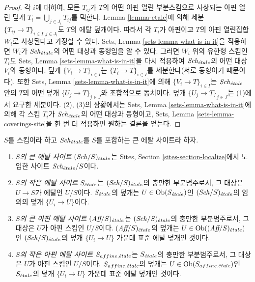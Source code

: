\begin{proof}
각 $i$에 대하여, 모든 $T_{ij}$가 $T$의 어떤 아핀 열린 부분스킴으로
사상되는 아핀 열린 덮개
$T_i = \bigcup_{j \in J_i} T_{ij}$를 택한다. Lemma
\ref{lemma-etale}에 의해 세분
$\{T_{ij} \to T\}_{i \in I, j \in J_i}$도 $T$의 에탈 덮개이다. 따라서
각 $T_i$가 아핀이고 $T$의 아핀 열린집합 $W_i$로 사상된다고 가정할 수
있다. Sets, Lemma \ref{sets-lemma-what-is-in-it}을 적용하면 $W_i$가
$\mathit{Sch}_{\acute{e}tale}$의 어떤 대상과 동형임을 알 수 있다. 그러면 $W_i$ 위의
유한형 스킴인 $T_i$도 Sets, Lemma \ref{sets-lemma-what-is-in-it}을 다시
적용하여 $\mathit{Sch}_{\acute{e}tale}$의 어떤 대상 $V_i$와 동형이다. 덮개
$\{V_i \to T\}_{i \in I}$는 $\{T_i \to T\}_{i \in I}$를 세분한다(서로
동형이기 때문이다). 또한 Sets, Lemma
\ref{sets-lemma-what-is-in-it}에 의해 $\{V_i \to T\}_{i \in I}$는
$\mathit{Sch}_{\acute{e}tale}$ 안의 $T$의 어떤 덮개 $\{U_j \to T\}_{j \in J}$와
조합적으로 동치이다. 덮개 $\{U_j \to T\}_{j \in J}$는 (1)에서 요구한
세분이다. (2), (3)의
상황에서는 Sets, Lemma \ref{sets-lemma-what-is-in-it}에 의해 각 스킴
$T_i$가 $\mathit{Sch}_{\acute{e}tale}$의 어떤 대상과 동형이고, Sets, Lemma
\ref{sets-lemma-coverings-site}을 한 번 더 적용하면 원하는 결론을 얻는다.
\end{proof}

\begin{definition}
\label{definition-big-small-etale}
$S$를 스킴이라 하고 $\mathit{Sch}_{\acute{e}tale}$를 $S$를 포함하는 큰 에탈 사이트라
하자.
\begin{enumerate}
\item {\it $S$의 큰 에탈 사이트} $(\mathit{Sch}/S)_{\acute{e}tale}$는 Sites, Section
\ref{sites-section-localize}에서 도입한 사이트 $\mathit{Sch}_{\acute{e}tale}/S$이다.
\item {\it $S$의 작은 에탈 사이트} $S_{\acute{e}tale}$는 $(\mathit{Sch}/S)_{\acute{e}tale}$의
충만한 부분범주로서, 그 대상은 $U \to S$가 에탈인 $U/S$이다.
$S_{\acute{e}tale}$의 덮개는 $U \in \mathop{\mathrm{Ob}}\nolimits(S_{\acute{e}tale})$인
$(\mathit{Sch}/S)_{\acute{e}tale}$의 임의의 덮개 $\{U_i \to U\}$이다.
\item {\it $S$의 큰 아핀 에탈 사이트} $(\textit{Aff}/S)_{\acute{e}tale}$는
$(\mathit{Sch}/S)_{\acute{e}tale}$의 충만한 부분범주로서, 그 대상은 $U$가 아핀 스킴인
$U/S$이다. $(\textit{Aff}/S)_{\acute{e}tale}$의 덮개는
$U \in \mathop{\mathrm{Ob}}\nolimits((\textit{Aff}/S)_{\acute{e}tale})$인 $(\mathit{Sch}/S)_{\acute{e}tale}$의 덮개
$\{U_i \to U\}$ 가운데 표준 에탈 덮개인 것이다.
\item {\it $S$의 작은 아핀 에탈 사이트} $S_{affine, {\acute{e}tale}}$는
$S_{\acute{e}tale}$의 충만한 부분범주로서, 그 대상은 $U$가 아핀 스킴인
$U/S$이다. $S_{affine, {\acute{e}tale}}$의 덮개는
$U \in \mathop{\mathrm{Ob}}\nolimits(S_{affine, {\acute{e}tale}})$인 $S_{\acute{e}tale}$의 덮개
$\{U_i \to U\}$ 가운데 표준 에탈 덮개인 것이다.
\end{enumerate}
\end{definition}


